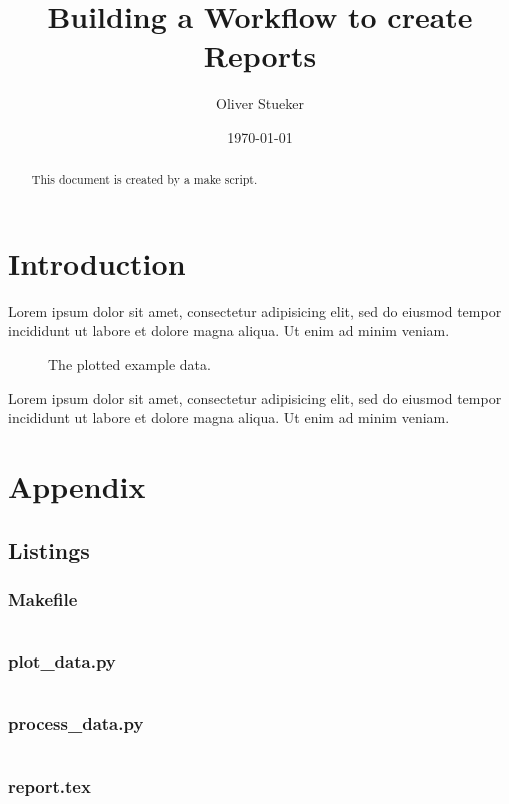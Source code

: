 \documentclass[10pt,letterpaper]{article}
\begin{document}
\title{Building a Workflow to create Reports}
\author{Oliver Stueker}
\date{\today}
\maketitle

\begin{abstract}
This document is created by a make script.
\end{abstract}

\section{Introduction}
Lorem ipsum dolor sit amet, consectetur adipisicing elit, sed do eiusmod
tempor incididunt ut labore et dolore magna aliqua. Ut enim ad minim veniam.

\begin{figure}[!ht]
	\centering
	
	\caption{The plotted example data.}
\end{figure}

Lorem ipsum dolor sit amet, consectetur adipisicing elit, sed do eiusmod
tempor incididunt ut labore et dolore magna aliqua. Ut enim ad minim veniam.

\newpage
\section{Appendix}

\subsection{Listings}

\subsubsection{Makefile}
\inputminted[linenos,frame=single]{makefile}{Makefile}

\subsubsection{plot\_data.py}
\inputminted[linenos,frame=single]{python}{plot_data.py}

\subsubsection{process\_data.py}
\inputminted[linenos,frame=single]{python}{process_data.py}

\subsubsection{report.tex}
\inputminted[linenos,frame=single]{latex}{report.tex}
\end{document}
